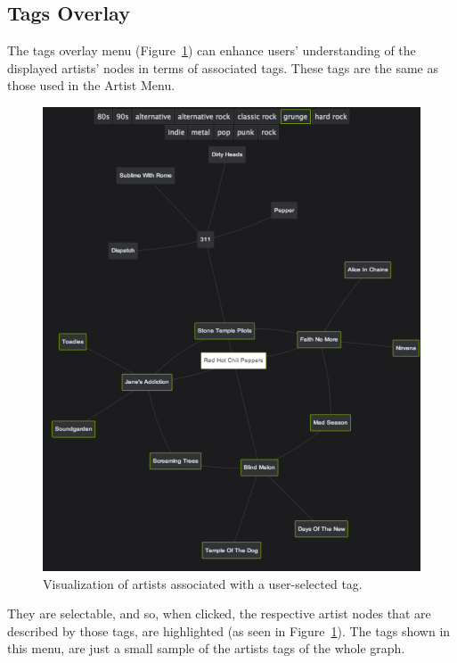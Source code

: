 \documentclass{article}
\begin{document}
    \subsection{Tags Overlay}
    \label{sub:tags_overlay}
    
      The tags overlay menu (Figure~\ref{fig:tags_overlay}) can enhance users' understanding of the displayed artists' nodes in terms of associated tags. These tags are the same as those used in the Artist Menu.
      \begin{figure}[th]
        \begin{center}
          \includegraphics[width=\columnwidth]{../report/figures/tags_overlay.pdf}
        \end{center}
        \caption{Visualization of artists associated with a user-selected tag.}
        \label{fig:tags_overlay}
      \end{figure}
      They are selectable, and so, when clicked, the respective artist nodes that are described by those tags, are highlighted (as seen in Figure~\ref{fig:tags_overlay}).
      The tags shown in this menu, are just a small sample of the artists tags of the whole graph.




\end{document}
